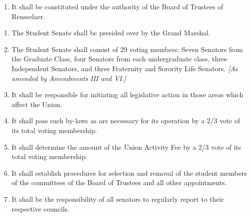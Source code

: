 

\begin{enumerate}
\item It shall be constituted under the authority of the Board of Trustees of Rensselaer.
\end{enumerate}



\begin{enumerate}
\item The Student Senate shall be presided over by the Grand Marshal.
\item The Student Senate shall consist of 29 voting members: Seven Senators from the Graduate Class, four Senators from each undergraduate class, three Independent Senators, and three Fraternity and Sorority Life Senators. \textit{[As amended by Amendments III and VI.]}
\item It shall be responsible for initiating all legislative action in those areas which affect the Union.
\item It shall pass such by-laws as are necessary for its operation by a 2/3 vote of its total voting membership.
\item It shall determine the amount of the Union Activity Fee by a 2/3 vote of its total voting membership.
\item It shall establish procedures for selection and removal of the student members of the committees of the Board of Trustees and all other appointments.
\item It shall be the responsibility of all senators to regularly report to their respective councils.
\end{enumerate}



